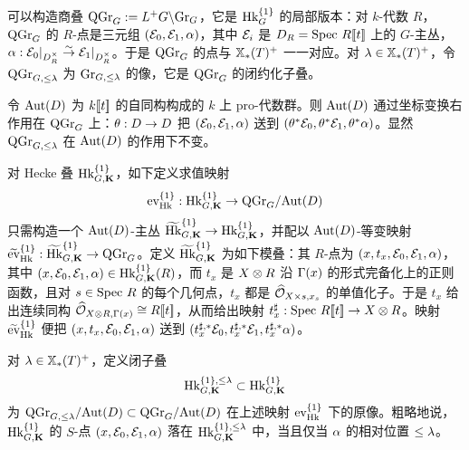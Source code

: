 可以构造商叠 $\mathrm{QGr}_{G}:=L^{+}G\backslash \textup{Gr}_{G}$，它是 $\textup{Hk}^{\{1\}}_{G}$ 的局部版本：对 $k$-代数 $R$，$\mathrm{QGr}_{G}$ 的 $R$-点是三元组 $(\mathcal{E}_{0}, \mathcal{E}_{1}, \alpha)$，其中 $\mathcal{E}_{i}$ 是 $D_{R}=\textup{Spec}\  R[\![t]\!]$ 上的 $G$-主丛，$\alpha: \mathcal{E}_{0}|_{D^{\times}_{R}}\stackrel{\sim}{\to} \mathcal{E}_{1}|_{D^{\times}_{R}}$。于是 $\mathrm{QGr}_{G}$ 的点与 $\mathbb{X}_*(T)^{+}$ 一一对应。对 $\lambda\in \mathbb{X}_*(T)^{+}$，令 $\mathrm{QGr}_{G, \le \lambda}$ 为 $\textup{Gr}_{G,\le \lambda}$ 的像，它是 $\mathrm{QGr}_{G}$ 的闭约化子叠。

令 $\textup{Aut}(D)$ 为 $k[\![t]\!]$ 的自同构构成的 $k$ 上 pro-代数群。则 $\textup{Aut}(D)$ 通过坐标变换右作用在 $\mathrm{QGr}_{G}$ 上：$\theta: D\to D$ 把 $(\mathcal{E}_{0},\mathcal{E}_{1}, \alpha)$ 送到 $(\theta^{*}\mathcal{E}_{0}, \theta^{*}\mathcal{E}_{1}, \theta^{*}\alpha)$。显然 $\mathrm{QGr}_{G, \le\lambda}$ 在 $\textup{Aut}(D)$ 的作用下不变。


对 Hecke 叠 $\textup{Hk}^{\{1\}}_{G,\mathbf{K}}$，如下定义求值映射
\begin{equation*}
\textup{ev}^{\{1\}}_{\textup{Hk}}: \textup{Hk}^{\{1\}}_{G,\mathbf{K}}\to \mathrm{QGr}_{G}/\textup{Aut}(D)
\end{equation*}
只需构造一个 $\textup{Aut}(D)$-主丛 $\widetilde{\textup{Hk}}^{\{1\}}_{G,\mathbf{K}}\to \textup{Hk}^{\{1\}}_{G,\mathbf{K}}$，并配以 $\textup{Aut}(D)$-等变映射 $\widetilde{\textup{ev}}^{\{1\}}_{\textup{Hk}}: \widetilde{\textup{Hk}}^{\{1\}}_{G,\mathbf{K}}\to \mathrm{QGr}_{G}$。定义 $\widetilde{\textup{Hk}}^{\{1\}}_{G,\mathbf{K}}$ 为如下模叠：其 $R$-点为 $(x, t_{x}, \mathcal{E}_{0}, \mathcal{E}_{1}, \alpha)$，其中 $(x,\mathcal{E}_{0},\mathcal{E}_{1}, \alpha)\in\textup{Hk}^{\{1\}}_{G,\mathbf{K}}(R)$，而 $t_{x}$ 是 $X\otimes R$ 沿 $\Gamma(x)$ 的形式完备化上的正则函数，且对 $s\in \textup{Spec}\  R$ 的每个几何点，$t_{x}$ 都是 $\widehat{\mathcal{O}}_{X\times s, x_{s}}$ 的单值化子。于是 $t_{x}$ 给出连续同构 $\widehat{\mathcal{O}}_{X\otimes R, \Gamma(x)}\cong R[\![t]\!]$，从而给出映射 $t^{\sharp}_{x}: \textup{Spec}\  R[\![t]\!]\to X\otimes R$。映射 $\widetilde{\textup{ev}}^{\{1\}}_{\textup{Hk}}$ 便把 $(x, t_{x}, \mathcal{E}_{0}, \mathcal{E}_{1}, \alpha)$ 送到 $(t^{\sharp, *}_{x}\mathcal{E}_{0}, t^{\sharp, *}_{x}\mathcal{E}_{1}, t^{\sharp, *}_{x}\alpha)$。

\label{sss:bd Hk}
对 $\lambda\in \mathbb{X}_*(T)^{+}$，定义闭子叠
\begin{equation*}
\textup{Hk}^{\{1\}, \le \lambda}_{G,\mathbf{K}}\subset \textup{Hk}^{\{1\}}_{G,\mathbf{K}}
\end{equation*}
为 $\mathrm{QGr}_{G,\le \lambda}/\textup{Aut}(D)\subset \mathrm{QGr}_{G}/\textup{Aut}(D)$ 在上述映射 $\textup{ev}^{\{1\}}_{\textup{Hk}}$ 下的原像。粗略地说，$\textup{Hk}^{\{1\}}_{G,\mathbf{K}}$ 的 $S$-点 $(x,\mathcal{E}_{0},\mathcal{E}_{1}, \alpha)$ 落在 $\textup{Hk}^{\{1\}, \le \lambda}_{G,\mathbf{K}}$ 中，当且仅当 $\alpha$ 的相对位置 $\le \lambda$。


